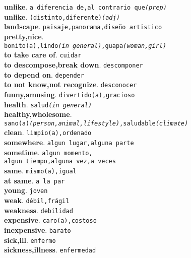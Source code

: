 \documentclass[twocolumn]{article}
\begin{document}
	\textsf{\textbf{unlike}}. \texttt{a diferencia de,al contrario que{\scriptsize \textsl{(prep)}}}\\
	\textsf{\textbf{unlike}}. \texttt{(distinto,diferente){\scriptsize \textsl{(adj)}}}\\
	\textsf{\textbf{landscape}}. \texttt{paisaje,panorama,dise\~no artistico}\\
	\textsf{\textbf{pretty,nice}}.\\\texttt{bonito(a),lindo{\scriptsize \textsl{(in general)}},guapa{\scriptsize \textsl{(woman,girl)}}}\\
	\textsf{\textbf{to take care of}}. \texttt{cuidar}\\
	\textsf{\textbf{to descompose,break down}}. \texttt{descomponer}\\
	\textsf{\textbf{to depend on}}. \texttt{depender}\\
	\textsf{\textbf{to not know,not recognize}}. \texttt{desconocer}\\
	\textsf{\textbf{funny,amusing}}. \texttt{divertido(a),gracioso}\\
	\textsf{\textbf{health}}. \texttt{salud{\scriptsize \textsl{(in general)}}}\\
	\textsf{\textbf{healthy,wholesome}}.\\
			  \texttt{sano(a){\scriptsize \textsl{(person,animal,lifestyle)}},saludable{\scriptsize \textsl{(climate)}}}\\
   \textsf{\textbf{clean}}. \texttt{limpio(a),ordenado}\\
	\textsf{\textbf{somewhere}}. \texttt{algun lugar,alguna parte}\\
	\textsf{\textbf{sometime}}. \texttt{algun momento,\\algun tiempo,alguna vez,a veces}\\
	\textsf{\textbf{same}}. \texttt{mismo(a),igual}\\
	\textsf{\textbf{at same}}. \texttt{a la par}\\
	\textsf{\textbf{young}}. \texttt{joven}\\
	\textsf{\textbf{weak}}. \texttt{d\'ebil,fr\'agil}\\
	\textsf{\textbf{weakness}}. \texttt{debilidad}\\
	\textsf{\textbf{expensive}}. \texttt{caro(a),costoso}\\
	\textsf{\textbf{inexpensive}}. \texttt{barato}\\
	\textsf{\textbf{sick,ill}}. \texttt{enfermo}\\
	\textsf{\textbf{sickness,illness}}. \texttt{enfermedad}\\
\end{document}

